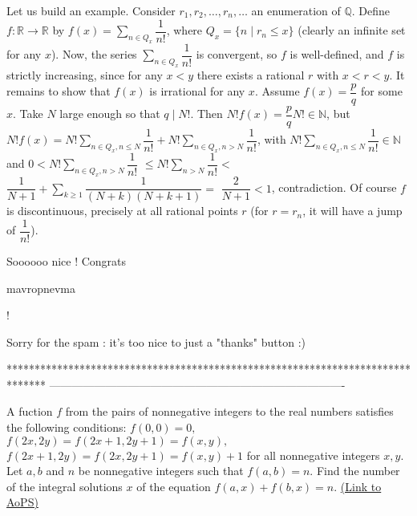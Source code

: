 \begin{solution}
	Let us build an example. Consider $r_1,r_2, \ldots,r_n,\ldots$ an enumeration of $\mathbb{Q}$. Define $f: \mathbb{R} \to \mathbb{R}$ by $\displaystyle f(x) = \sum_{n \in Q_x} \dfrac {1} {n!}$, where $Q_x = \{n \mid r_n \leq x\}$ (clearly an infinite set for any $x$). Now, the series $\displaystyle \sum_{n \in Q_x} \dfrac {1} {n!}$ is convergent, so $f$ is well-defined, and $f$ is strictly increasing, since for any $x<y$ there exists a rational $r$ with $x<r<y$. It remains to show that $f(x)$ is irrational for any $x$. Assume $f(x) = \dfrac {p} {q}$ for some $x$. Take $N$ large enough so that $q\mid N!$. Then $N!f(x) = \dfrac {p} {q} N! \in \mathbb{N}$, but $\displaystyle N!f(x) = N!\sum_{n \in Q_x, n\leq N} \dfrac {1} {n!} + N!\sum_{n \in Q_x, n > N} \dfrac {1} {n!}$, with $\displaystyle N!\sum_{n \in Q_x, n\leq N} \dfrac {1} {n!} \in \mathbb{N}$ and $\displaystyle 0< N!\sum_{n \in Q_x, n > N} \dfrac {1} {n!} $ $\leq N!\sum_{n > N} \dfrac {1} {n!} <$ $ \dfrac {1} {N+1} + \sum_{k \geq 1} \dfrac {1} {(N+k)(N+k+1)} =$ $ \dfrac {2} {N+1} < 1$, contradiction.
Of course $f$ is discontinuous, precisely at all rational points $r$ (for $r=r_n$, it will have a jump of $\dfrac {1} {n!}$).
\end{solution}



\begin{solution}
	Soooooo nice !
Congrats \begin{bolded}mavropnevma\end{bolded} !

Sorry for the spam : it's too nice to just a "thanks" button :)
\end{solution}
*******************************************************************************
-------------------------------------------------------------------------------

\begin{problem}
	A fuction $f$ from the pairs of nonnegative integers to the  real numbers satisfies the following  conditions:
$f(0,0)=0,$   $f(2x,2y)=f(2x+1,2y+1)=f(x,y),$  $f(2x+1,2y)=f(2x,2y+1)=f(x,y)+1$ 
for all nonnegative  integers $x,y$.  Let  $a,b$ and $n$ be nonnegative integers  such that  $f(a,b)=n$.  Find the number of the integral  solutions $x$ of the  equation  $f(a,x)+f(b,x)=n.$
	\flushright \href{https://artofproblemsolving.com/community/c6h537660}{(Link to AoPS)}
\end{problem}



